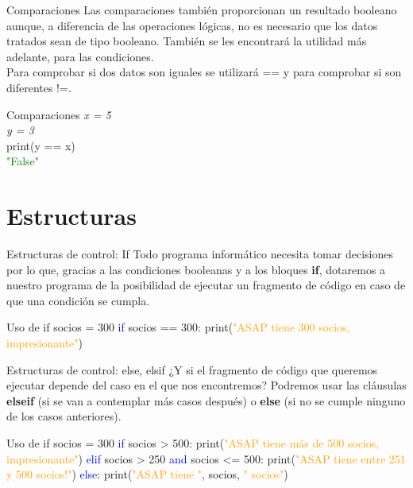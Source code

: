 \documentclass{beamer}
\begin{document}
\begin{frame}{Comparaciones}
Las comparaciones también proporcionan un resultado booleano aunque, a diferencia de las operaciones lógicas, no es necesario que los datos tratados sean de tipo booleano. También se les encontrará la utilidad más adelante, para las condiciones.\\
Para comprobar si dos datos son iguales se utilizará == y para comprobar si son diferentes !=.
\begin{Programexample} {Comparaciones}
\centering
\textit{x = 5}\\
\textit{y = 3}\\
print(y == x)\\
\textcolor{green}{"False"}
\end{Programexample}
\end{frame}

\section{Estructuras}

\begin{frame}{Estructuras de control: If}
Todo programa informático necesita tomar decisiones por lo que, gracias a las condiciones booleanas y a los bloques \textbf{if}, dotaremos a nuestro programa de la posibilidad de ejecutar un fragmento de código en caso de que una condición se cumpla.
\begin{Programexample} {Uso de if}
socios = 300 \newline
\textcolor{blue}{if} socios == 300:\newline
\hspace*{1cm} print(\textcolor{orange}{"ASAP tiene 300 socios, impresionante"})
\end{Programexample}
\end{frame}

\begin{frame}{Estructuras de control: else, elsif}
¿Y si el fragmento de código que queremos ejecutar depende del caso en el que nos encontremos? Podremos usar las cláusulas \textbf{elseif} (si se van a contemplar más casos después) o \textbf{else} (si no se cumple ninguno de los casos anteriores).
\begin{Programexample} {Uso de if}
socios = 300 \newline
\textcolor{blue}{if} socios > 500:\newline
\hspace*{1cm} print(\textcolor{orange}{"ASAP tiene más de 500 socios, impresionante"})\newline
\textcolor{blue}{elif} socios > 250 \textcolor{blue}{and} socios <= 500:\newline
\hspace*{1cm} print(\textcolor{orange}{"ASAP tiene entre 251 y 500 socios!"})\newline
\textcolor{blue}{else}:\newline
\hspace*{1cm} print(\textcolor{orange}{"ASAP tiene "}, socios,  \textcolor{orange}{" socios"})
\end{Programexample}
\end{frame}
\end{document}
